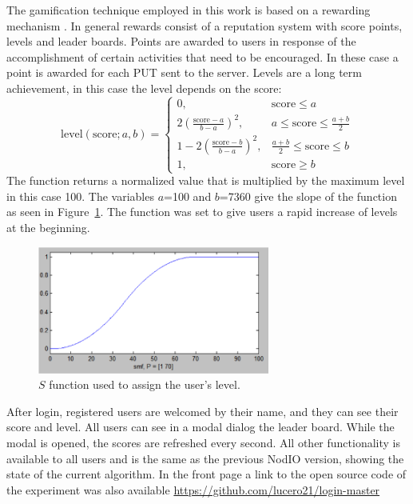 \documentclass{llncs}
\begin{document}
The gamification technique employed in this work is based on a rewarding mechanism  
\cite{dubois2013understanding}. In general rewards  consist of a reputation system 
with score points, levels and leader boards. Points are awarded to users in response of 
the accomplishment of certain activities that need to be encouraged. In these case
a point is awarded for each PUT sent to the server. Levels are a long
term achievement, in this case the level depends on the score:
\[ \text{level}(\text{score};a,b)= 
    \begin{cases} 
      0,                                    &  \text{score}\leq a\\    
      2(\frac{\text{score}-a}{b-a})^{2},    &  a\leq \text{score}\leq \frac{a+b}{2}\\
      1-2(\frac{\text{score}-b}{b-a})^{2},  & \frac{a+b}{2} \leq \text{score}\leq b\\
      1,                                    & \text{score}\geq b 
   \end{cases}
\]
The function returns a normalized value that is multiplied by the maximum level 
in this case 100. The variables $a$=100 and $b$=7360 give the slope of the function as
seen in Figure~\ref{fig:s}. The function was set to give users a rapid increase of 
levels at the beginning.
\begin{figure}[t]
    \centering
        \includegraphics[width=3in]{img/s.png}
    \caption{$S$ function used to assign the user's level.
    }
    \label{fig:s}
\end{figure}

After login, registered users are welcomed by their name, and they can see
their score and level. All users can see in a modal dialog the leader board.
While the modal is opened, the scores are refreshed every second. All other 
functionality is available to all users and is the same as the previous 
{\sf NodIO} version, showing the state of the current algorithm. 
In the front page a link to the open source code of the experiment was also 
available \url{https://github.com/lucero21/login-master} 
\end{document}
